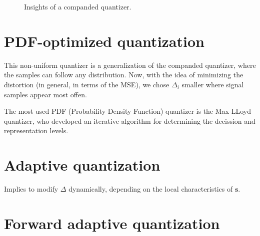 \begin{figure}
  \caption{Insights of a companded quantizer.}
  \label{fig:companded_quantizer}
\end{figure}


\section{PDF-optimized quantization}

This non-uniform quantizer is a generalization of the companded
quantizer, where the samples can follow any distribution. Now, with
the idea of minimizing the distortion (in general, in terms of the
MSE), we chose $\Delta_i$ smaller where signal samples appear most
offen.

The most used PDF (Probability Density Function) quantizer is the
Max-LLoyd quantizer, who developed an iterative algorithm for
determining the decission and representation levels.



\section{Adaptive quantization}

Implies to modify $\Delta$ dynamically, depending on the local characteristics of ${\mathbf s}$.


\section{Forward adaptive quantization}

